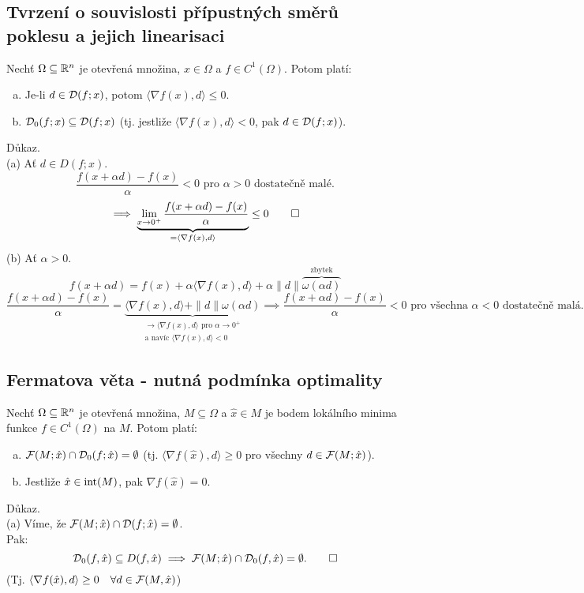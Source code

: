 \subsection{Tvrzení o souvislosti přípustných směrů poklesu a jejich linearisaci}
Nechť $\Omega \subseteq \mathbb{R}^n$ je otevřená množina, $x \in \Omega$ a $f \in C^1(\Omega)$. Potom platí:
\begin{enumerate}[(a)]
    \item Je-li $d \in \mathcal{D}(f; x)$, potom $\langle \nabla f(x), d\rangle \leq 0$.
    \item $\mathcal{D}_0(f;x) \subseteq \mathcal{D}(f;x)$ (tj. jestliže $\langle \nabla f(x), d\rangle < 0$, pak $d \in \mathcal{D}(f;x)$).
\end{enumerate}
Důkaz.\\
(a) Ať $d \in D(f;x)$.
\[
    \frac{f(x + \alpha d) - f(x)}{\alpha} < 0 \text{ pro } \alpha > 0 \text{ dostatečně malé.}
\]
\[
    \implies \underbrace{\lim_{x\rightarrow 0^+ } \frac{f(x+\alpha d) - f(x)}{\alpha}}_{= \langle \nabla f(x), d\rangle}
    \leq 0 \qed
\]
\newpage
(b) Ať $\alpha > 0$.
\[
    f(x+\alpha d) = f(x) + \alpha \langle \nabla f(x), d\rangle + \alpha \| d\|
    \overbrace{\omega (\alpha d)}^{\text{zbytek}}
\]
\[
    \frac{f(x+\alpha d) - f(x)}{\alpha} = \underbrace{\langle \nabla f(x), d\rangle + \| d\| \omega (\alpha d)}_{
    \substack{\rightarrow \langle \nabla f(x), d\rangle \text{ pro } \alpha \rightarrow 0^+ \\ \text{a navíc }
    \langle\nabla f(x), d \rangle < 0}} \implies \frac{f(x + \alpha d) - f(x)}{\alpha} < 0
    \text{ pro všechna } \alpha < 0 \text{ dostatečně malá.}
\]

\subsection{Fermatova věta - nutná podmínka optimality}\label{fermat}
Nechť $\Omega \subseteq \mathbb{R}^n$ je otevřená množina, $M \subseteq \Omega$ a $\hat x \in M$ je bodem lokálního minima
funkce $f \in C^1(\Omega)$ na $M$. Potom platí:
\begin{enumerate}[(a)]
    \item $\mathcal{F}(M; \hat x) \cap \mathcal{D}_0(f; \hat x) = \emptyset$ (tj. $\langle \nabla f(\hat x), d\rangle \geq 0$ pro všechny
    $d \in \mathcal{F}(M; \hat x)$).
    \item Jestliže $\hat x \in \operatorname*{int}(M)$, pak $\nabla f(\hat x) = 0$.
\end{enumerate}
Důkaz.\\
(a) Víme, že $\mathcal{F}(M; \hat x) \cap \mathcal{D}(f; \hat x) = \emptyset$.\\ \label{fermatA}
Pak:
\[
    \mathcal{D}_0 (f, \hat x) \subseteq D(f, \hat x) \implies \mathcal{F}(M; \hat x) \cap \mathcal{D}_0(f, \hat x) = \emptyset. \qed
\]
(Tj. $\langle \nabla f(\hat x), d\rangle \geq 0 \quad \forall d \in \mathcal{F}(M, \hat x)$)


